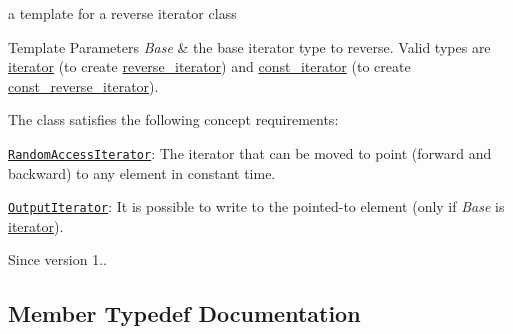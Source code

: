 a template for a reverse iterator class 


\begin{DoxyTemplParams}{Template Parameters}
{\em Base} & the base iterator type to reverse. Valid types are \hyperlink{classnlohmann_1_1basic__json_1_1iterator}{iterator} (to create \hyperlink{classnlohmann_1_1basic__json_a2f1f83aa187a56dc5ec7a7027065ac8a}{reverse\+\_\+iterator}) and \hyperlink{classnlohmann_1_1basic__json_1_1const__iterator}{const\+\_\+iterator} (to create \hyperlink{classnlohmann_1_1basic__json_ae336fff01f4b78e3e16e5008dc8dbc00}{const\+\_\+reverse\+\_\+iterator}).\\
\hline
\end{DoxyTemplParams}
The class satisfies the following concept requirements\+:
\begin{DoxyItemize}
\item \href{http://en.cppreference.com/w/cpp/concept/RandomAccessIterator}{\tt Random\+Access\+Iterator}\+: The iterator that can be moved to point (forward and backward) to any element in constant time.
\item \href{http://en.cppreference.com/w/cpp/concept/OutputIterator}{\tt Output\+Iterator}\+: It is possible to write to the pointed-\/to element (only if {\itshape Base} is \hyperlink{classnlohmann_1_1basic__json_1_1iterator}{iterator}).
\end{DoxyItemize}

\begin{DoxySince}{Since}
version 1.. 
\end{DoxySince}


\subsection{Member Typedef Documentation}
